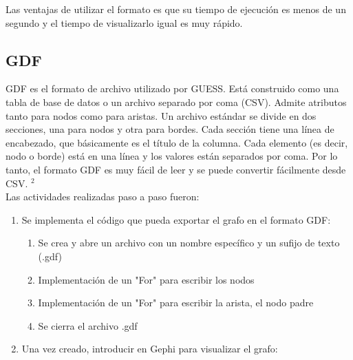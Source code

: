 \documentclass[book, 16 pt, conference]{ieeeconf}
\begin{document}
Las ventajas de utilizar el formato es que su tiempo de ejecución es menos de un segundo y el tiempo de visualizarlo igual es muy rápido.

\subsection{GDF}

GDF es el formato de archivo utilizado por GUESS. Está construido como una tabla de base de datos o un archivo separado por coma (CSV). Admite atributos tanto para nodos como para aristas. Un archivo estándar se divide en dos secciones, una para nodos y otra para bordes. Cada sección tiene una línea de encabezado, que básicamente es el título de la columna. Cada elemento (es decir, nodo o borde) está en una línea y los valores están separados por coma. Por lo tanto, el formato GDF es muy fácil de leer y se puede convertir fácilmente desde CSV. $^{2}$  \\

Las actividades realizadas paso a paso fueron: \\

\begin{enumerate}
\item Se implementa el código que pueda exportar el grafo en el formato GDF:
	\begin{enumerate}
	\item Se crea y abre un archivo con un nombre específico y un sufijo de texto (.gdf)
	\item Implementación de un "For" para escribir los nodos
	\item Implementación de un "For" para escribir la arista, el nodo padre
	\item Se cierra el archivo .gdf
	\end{enumerate}
\item Una vez creado, introducir en Gephi para visualizar el grafo: \\
\end{enumerate} 
\end{document}
